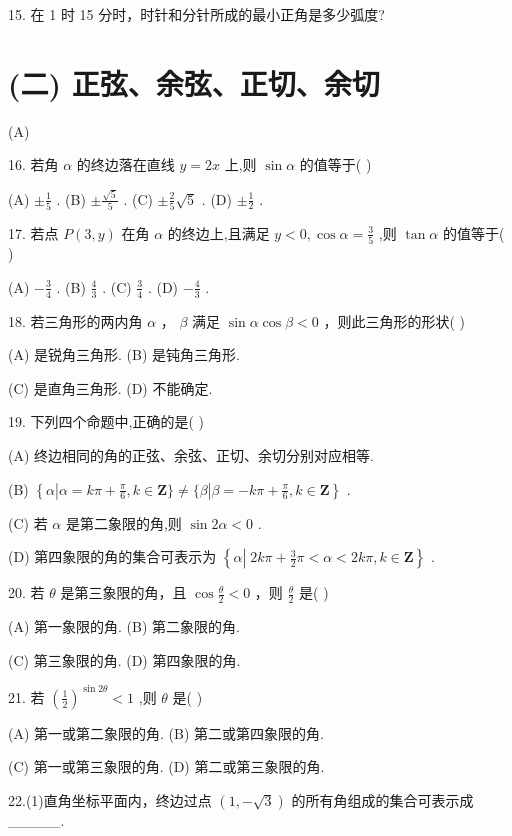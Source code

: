 \documentclass[10pt]{article}
\begin{document}
15. 在 1 时 15 分时，时针和分针所成的最小正角是多少弧度?

\section*{(二) 正弦、余弦、正切、余切}

(A)

16. 若角 \(\alpha\) 的终边落在直线 \(y = {2x}\) 上,则 \(\sin \alpha\) 的值等于( )

(A) \(\pm  \frac{1}{5}\) . (B) \(\pm  \frac{\sqrt{5}}{5}\) . (C) \(\pm  \frac{2}{5}\sqrt{5}\) . (D) \(\pm  \frac{1}{2}\) .

17. 若点 \(P\left( {3,y}\right)\) 在角 \(\alpha\) 的终边上,且满足 \(y < 0,\cos \alpha  = \frac{3}{5}\) ,则 \(\tan \alpha\) 的值等于( )

(A) \(- \frac{3}{4}\) . (B) \(\frac{4}{3}\) . (C) \(\frac{3}{4}\) . (D) \(- \frac{4}{3}\) .

18. 若三角形的两内角 \(\alpha\) ， \(\beta\) 满足 \(\sin \alpha \cos \beta  < 0\) ，则此三角形的形状( )

(A) 是锐角三角形. (B) 是钝角三角形.

(C) 是直角三角形. (D) 不能确定.

19. 下列四个命题中,正确的是( )

(A) 终边相同的角的正弦、余弦、正切、余切分别对应相等.

(B) \(\left\{  {\alpha \left| {\alpha  = {k\pi } + \frac{\pi }{6},k \in  \mathbf{Z}\}  \neq  \{ \beta }\right| \beta  =  - {k\pi } + \frac{\pi }{6},k \in  \mathbf{Z}}\right\}\) .

(C) 若 \(\alpha\) 是第二象限的角,则 \(\sin {2\alpha } < 0\) .

(D) 第四象限的角的集合可表示为 \(\left\{  {\alpha \left| {\;{2k\pi } + \frac{3}{2}\pi  < \alpha  < {2k\pi }}\right. ,k \in  \mathbf{Z}}\right\}\) .

20. 若 \(\theta\) 是第三象限的角，且 \(\cos \frac{\theta }{2} < 0\) ，则 \(\frac{\theta }{2}\) 是( )

(A) 第一象限的角. (B) 第二象限的角.

(C) 第三象限的角. (D) 第四象限的角.

21. 若 \({\left( \frac{1}{2}\right) }^{\sin {2\theta }} < 1\) ,则 \(\theta\) 是( )

(A) 第一或第二象限的角. (B) 第二或第四象限的角.

(C) 第一或第三象限的角. (D) 第二或第三象限的角.

22.(1)直角坐标平面内，终边过点 \(\left( {1, - \sqrt{3}}\right)\) 的所有角组成的集合可表示成\_\_\_\_\_.
\end{document}
